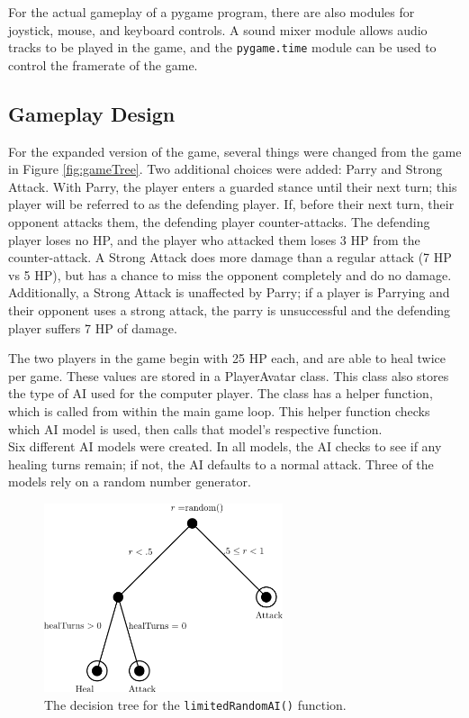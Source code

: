 For the actual gameplay of a pygame program, there are also modules for joystick, mouse, and keyboard controls. A sound mixer module allows audio tracks to be played in the game, and the \texttt{pygame.time} module can be used to control the framerate of the game.

\subsection{Gameplay Design}
For the expanded version of the game, several things were changed from the game in Figure \ref{fig:gameTree}. Two additional choices were added: Parry and Strong Attack. With Parry, the player enters a guarded stance until their next turn; this player will be referred to as the defending player. If, before their next turn, their opponent attacks them, the defending player counter-attacks. The defending player loses no HP, and the player who attacked them loses 3 HP from the counter-attack. A Strong Attack does more damage than a regular attack (7 HP vs 5 HP), but has a chance to miss the opponent completely and do no damage. Additionally, a Strong Attack is unaffected by Parry; if a player is Parrying and their opponent uses a strong attack, the parry is unsuccessful and the defending player suffers 7 HP of damage.

The two players in the game begin with 25 HP each, and are able to heal twice per game. These values are stored in a PlayerAvatar class. This class also stores the type of AI used for the computer player. The class has a helper function, which is called from within the main game loop. This helper function checks which AI model is used, then calls that model's respective function.\\

Six different AI models were created. In all models, the AI checks to see if any healing turns remain; if not, the AI defaults to a normal attack. Three of the models rely on a random number generator.\\

\begin{figure}[H]
  \centering
  \includegraphics[width=7cm]{figures/AILimitedRandom.png}
  \caption{The decision tree for the \texttt{limitedRandomAI()} function.}
  \label{fig:AI1}
\end{figure}

